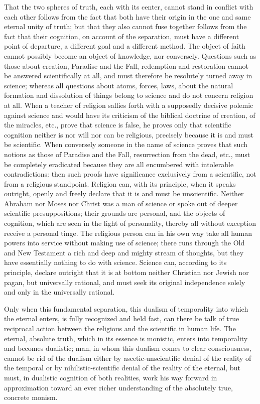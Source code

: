 \documentclass[12pt,a4paper]{article}
\newcommand{\opage}[1]{\marginnote{\footnotesize\textit{[#1]}}}
\begin{document}
That the two spheres of truth, each with its center, cannot
stand in conflict with each other follows from the fact that both have their
origin in the one and same eternal unity of truth; but that
they also cannot fuse together follows from the fact that their
cognition, on account of the separation, must have a different point of
departure, a different goal and a different method. The object of faith
cannot possibly become an object of knowledge, nor conversely. Questions
such as those about creation, Paradise and the Fall, redemption and
restoration cannot be answered scientifically at all, and must
therefore be resolutely turned away in science; whereas all questions
\opage{16}about atoms, forces, laws, about the natural formation and
dissolution of things belong to science and do not concern religion
at all. When a teacher of religion sallies forth with a supposedly
decisive polemic against science and would have its criticism of the
biblical doctrine of creation, of the miracles, etc., prove that science
is false, he proves only that scientific
cognition neither is nor will nor can be religious, precisely because
it is and must be scientific. When conversely someone in the name of
science proves that such notions as those of
Paradise and the Fall, resurrection from the dead, etc., must be completely
eradicated because they are all encumbered with intolerable
contradictions: then such proofs have significance exclusively from a
scientific, not from a religious standpoint. Religion can,
with its principle, when it speaks outright, openly and freely declare
that it is and must be unscientific. Neither Abraham nor
Moses nor Christ was a man of science or spoke out of
deeper scientific presuppositions; their grounds are personal,
and the objects of cognition, which are seen in the light of personality,
thereby all without exception receive a personal tinge. The religious person
can in his own way take all human powers into service without
making use of science; there runs through the Old and
New Testament a rich and deep and mighty stream of thoughts, but
they have essentially nothing to do with science. Science
can, according to its principle, declare outright that it is at bottom neither
Christian nor Jewish nor pagan, but universally rational, and
must seek its original independence solely and only in the universally rational.

Only when this fundamental separation, this dualism of temporality
into which the eternal enters, is fully recognized and held fast, can there
be talk of true reciprocal action between the religious and the
scientific in human life. The eternal, absolute truth,
which in its essence is monistic, enters into temporality and becomes
dualistic; man, in whom this dualism comes to clear
consciousness, cannot be rid of the dualism either by ascetic-unscientific
denial of the reality of the temporal or by
\opage{17}nihilistic-scientific denial of the reality of the eternal, but must,
in dualistic cognition of both realities, work his way forward in
approximation toward an ever richer understanding of the absolutely true,
concrete monism.
\end{document}
